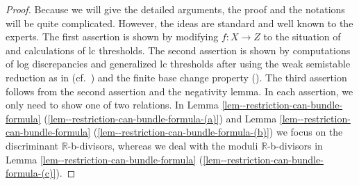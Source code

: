 \documentclass[12pt]{amsart}
\theoremstyle{definition}
\begin{document}
\begin{proof}
Because we will give the detailed arguments, the proof and the notations will be quite complicated. 
However, the ideas are standard and well known to the experts. 
The first assertion is shown by modifying $f \colon X \to Z$ to the situation of \cite[Theorem 2]{kawamata-subadjunction-II} and calculations of lc thresholds. 
The second assertion is shown by computations of log discrepancies and generalized lc thresholds after using the weak semistable reduction as in \cite[Theorem 1.17]{haconpaun} (cf.~\cite[Subsection 4.5]{eh-semistablereduction}) and the finite base change property (\cite[Theorem 3.2]{ambro-phdthesis}). 
The third assertion follows from the second assertion and the negativity lemma. 
In each assertion, we only need to show one of two relations. 
In Lemma \ref{lem--restriction-can-bundle-formula} (\ref{lem--restriction-can-bundle-formula-(a)}) and Lemma \ref{lem--restriction-can-bundle-formula} (\ref{lem--restriction-can-bundle-formula-(b)}) we focus on the discriminant $\mathbb{R}$-b-divisors, whereas we deal with the moduli $\mathbb{R}$-b-divisors in Lemma \ref{lem--restriction-can-bundle-formula} (\ref{lem--restriction-can-bundle-formula-(c)}). 


\end{proof}
\end{document}
